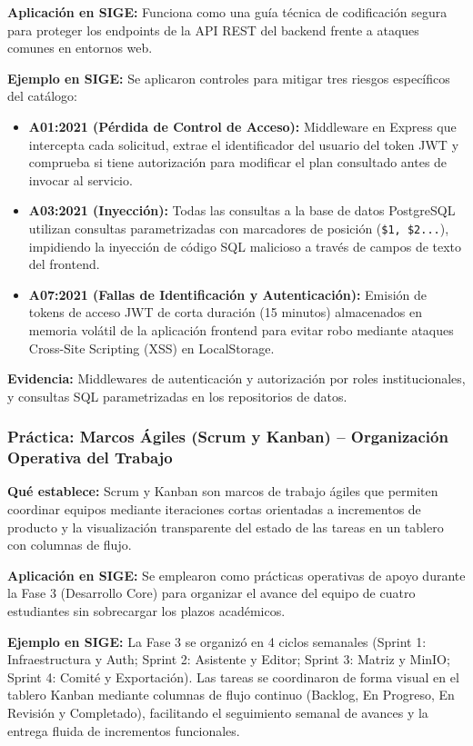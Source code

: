 \documentclass[12pt,a4paper]{article}
\begin{document}
\textbf{Aplicación en SIGE:}
Funciona como una guía técnica de codificación segura para proteger los endpoints de la API REST del backend frente a ataques comunes en entornos web.

\textbf{Ejemplo en SIGE:}
Se aplicaron controles para mitigar tres riesgos específicos del catálogo:
\begin{itemize}[leftmargin=1.5em, itemsep=2pt]
    \item \textbf{A01:2021 (Pérdida de Control de Acceso):} Middleware en Express que intercepta cada solicitud, extrae el identificador del usuario del token JWT y comprueba si tiene autorización para modificar el plan consultado antes de invocar al servicio.
    \item \textbf{A03:2021 (Inyección):} Todas las consultas a la base de datos PostgreSQL utilizan consultas parametrizadas con marcadores de posición (\texttt{\$1, \$2...}), impidiendo la inyección de código SQL malicioso a través de campos de texto del frontend.
    \item \textbf{A07:2021 (Fallas de Identificación y Autenticación):} Emisión de tokens de acceso JWT de corta duración (15 minutos) almacenados en memoria volátil de la aplicación frontend para evitar robo mediante ataques Cross-Site Scripting (XSS) en LocalStorage.
\end{itemize}

\textbf{Evidencia:}
Middlewares de autenticación y autorización por roles institucionales, y consultas SQL parametrizadas en los repositorios de datos.

\subsubsection{Práctica: Marcos Ágiles (Scrum y Kanban) -- Organización Operativa del Trabajo}

\textbf{Qué establece:}
Scrum y Kanban son marcos de trabajo ágiles que permiten coordinar equipos mediante iteraciones cortas orientadas a incrementos de producto y la visualización transparente del estado de las tareas en un tablero con columnas de flujo.

\textbf{Aplicación en SIGE:}
Se emplearon como prácticas operativas de apoyo durante la Fase 3 (Desarrollo Core) para organizar el avance del equipo de cuatro estudiantes sin sobrecargar los plazos académicos.

\textbf{Ejemplo en SIGE:}
La Fase 3 se organizó en 4 ciclos semanales (Sprint 1: Infraestructura y Auth; Sprint 2: Asistente y Editor; Sprint 3: Matriz y MinIO; Sprint 4: Comité y Exportación). Las tareas se coordinaron de forma visual en el tablero Kanban mediante columnas de flujo continuo (Backlog, En Progreso, En Revisión y Completado), facilitando el seguimiento semanal de avances y la entrega fluida de incrementos funcionales.
\end{document}
